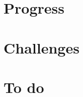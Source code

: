 \documentclass{beamer}
\begin{document}
\section{Progress}

\section{Challenges}

\section{To do}


\begin{frame}
\end{frame}
\end{document}
